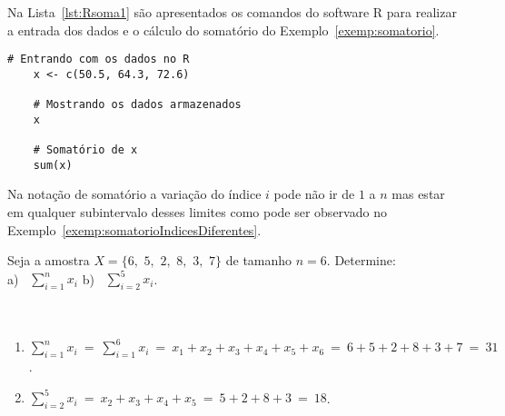 \documentclass[11pt,fleqn]{book} %
\begin{document}
Na Lista~\ref{lst:Rsoma1} são apresentados os comandos do software R para realizar a entrada dos dados e o cálculo do somatório do Exemplo~\ref{exemp:somatorio}.\\

\begin{scriptsize}
	\estiloR
	\begin{lstlisting}[caption={Comandos do software R}, label=lst:Rsoma1]
	# Entrando com os dados no R
	x <- c(50.5, 64.3, 72.6)
	
	# Mostrando os dados armazenados
	x

	# Somatório de x
	sum(x)

	\end{lstlisting}
\end{scriptsize}


Na notação de somatório a variação do índice $i$ pode não ir de $1$ a $n$ mas estar em qualquer subintervalo desses limites como pode ser observado no Exemplo~\ref{exemp:somatorioIndicesDiferentes}.\\


\begin{example} \label{exemp:somatorioIndicesDiferentes}

	Seja a amostra  $X=\{6,\,\,  5,\,\,  2,\,\,  8,\,\,  3,\,\,  7\}$ de tamanho $n=6$. Determine: \\

	\noindent \hspace{0.4cm} a) \, $\displaystyle \sum_{i=1}^{n}{x_i}$ 
	                  \qquad b) \, $\displaystyle \sum_{i=2}^{5}{x_i}$. \\ \\
	
	\noindent \hspace{0.3cm}{\small\bf\sffamily Solução} \\
	
	\begin{enumerate}[label=\alph*)]
	
	\item $\displaystyle \sum_{i=1}^{n}{x_i} \ = \ \sum_{i=1}^{6}{x_i} \ = \ x_1+x_2+x_3+x_4+x_5+x_6 \ = \ 6+5+2+8+3+7 \ = \ 31 $.
	\item $\displaystyle \sum_{i=2}^{5}{x_i} \ = \ x_2+x_3+x_4+x_5 \ = \ 5+2+8+3 \ = \ 18 $.
	\end{enumerate}
	
\end{example}
\vspace{0.3cm}

\end{document}
